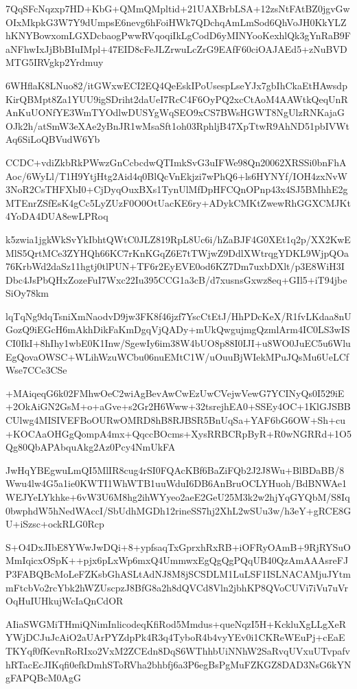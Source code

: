 \documentclass[]{article}
\newenvironment{Shaded}{\begin{snugshade}}{\end{snugshade}}
\newcommand{\NormalTok}[1]{#1}
\begin{document}
\begin{Shaded}
\begin{Highlighting}[]
\NormalTok{7QqSFcNqzxp7HD+KbG+QMmQMpltid+21UAXBrbLSA+12zsNtFAtBZ0jgvGwOIxMkpkG3W7Y9dUmpsE6nevg6hFoiHWk7QDchqAmLmSod6QhVoJH0KkYLZhKNYBowxomLGXDcbaogPwwRVqoqiIkLgCodD6yMINYooKexhlQk3gYnRaB9FaNFhwIxJjBbBIuIMpl+47EID8cFeJLZrwuLcZrG9EAfF60ciOAJAEd5+zNuBVDMTG5IRVgkp2Yrdmuy}

\NormalTok{6WHflaK8LNuo82/itGWxwECI2EQ4QeEskIPoUsespLseYJx7gbIhCkaEtHAwsdpKirQBMpt8Za1YUU9igSDriht2daUeI7RcC4F6OyPQ2xcCtAoM4AAWtkQeqUnRAnKuUONfYE3WmTYOdlwDUSYgWqSEO9xCS7BWsHGWT8NgUlzRNKajaGOJk2h/atSmW3eXAe2yBnJR1wMsaSft1oh03RphljB47XpTtwR9AhND51pbIVWtAq6SiLoQBVudW6Yb}

\NormalTok{CCDC+vdiZkbRkPWwzGnCcbcdwQTImkSvG3uIFWe98Qn20062XRSSi0bnFhAAoc/6WyLl/T1H9YtjHtg2Aid4q0BlQcVnEkjzi7wPhQ6+ls6HYNYf/IOH4zxNvW3NoR2CsTHFXbI0+CjDyqOuxBXs1TynUlMfDpHFCQnOPnp43x4SJ5BMhhE2gMTEnrZSfEsK4gCc5LyZUzF0O0OtUacKE6ry+ADykCMKtZwewRhGGXCMJKt4YoDA4DUA8ewLPRoq}

\NormalTok{k5zwia1jgkWkSvYkIbhtQWtC0JLZ819RpL8Uc6i/hZaBJF4G0XEt1q2p/XX2KwEMlS5QrtMCe3ZYHQh66KC7rKnKGqZ6E7tTWjwZ9DdlXWtrqgYDKL9WjpQOa76KrbWd2daSz11hgtj0tlPUN+TF6r2EyEVE0od6KZ7Dm7uxbDXlt/p3E8WiH3IDbc4JsPbQHxZozeFuI7Wxc22Iu395CCG1a3cB/d7xusnsGxwz8eq+GIl5+iT94jbeSiOy78km}

\NormalTok{lqTqNg9dqTsniXmNaodvD9jw3FK8f46jzf7YscCtEtJ/HhPDcKeX/R1fvLKdaa8nUGozQ9iEGcH6mAkhDikFaKmDgqVjQADy+mUkQwgujmgQzmlArm4IC0LS3wISCI0IkI+8hIhy1wbE0K1Inw/SgewIy6im38W4bUO8p88I0IJI+u8WO0JuEC5u6WluEgQovaOWSC+WLihWzuWCbu06nuEMtC1W/uOuuBjWIekMPuJQsMu6UeLCfWse7CCe3CSe}

\NormalTok{+MAiqeqG6k02FMhwOeC2wiAgBevAwCwEzUwCVejwVewG7YCINyQs0I529iE+2OkAiGN2GsM+o+aGve+s2Gr2H6Www+32tsrejhEA0+SSEy4OC+1KlGJSBBCUlwg4MISIVEFBoOURwOMRD8hB8RJBSR5BnUqSa+YAF6bG6OW+Sh+cu+KOCAaOHGgQompA4mx+QqccBOcms+XysRRBCRpByR+R0wNGRRd+1O5Qg80QbAPAbquAkg2Az0Pcy4NmUkFA}

\NormalTok{JwHqYBEgwuLmQI5MlIR8cug4rSI0FQAcKBf6BaZiFQb2J2J8Wu+BlBDaBB/8Wwu4lw4G5a1ie0KWTI1WhWTB1uuWduI6DB6AnBruOCLYHuoh/BdBNWAe1WEJYeLYkhke+6vW3U6M8hg2ihWYyeo2aeE2GeU25M3k2w2hjYqGYQbM/S8Iq0bwphdW5hNedWAccI/SbUdhMGDh12rineSS7hj2XhL2wSUu3w/h3eY+gRCE8GU+iSzsc+ockRLG0Rcp}

\NormalTok{S+O4DxJIbE8YWwJwDQi+8+ypfsaqTxGprxhRxRB+iOFRyOAmB+9RjRYSuOMmIqicxOSpK++pjx6pLxWp6mxQ4UmmwxEgQgQgPQqUB40QzAmAAAsreFJP3FABQBcMoLeFZKsbGhASLtAdNJ8M8jSCSDLM1LuLSF1ISLNACAMjuJYtmmFtcbVo2rcYbk2hWZUscpzJ8BfG8a2h8dQVCd8Vln2jbhKP8QVoCUVi7iVu7uVrOqHuIUHkujWcIaQnCdOR}

\NormalTok{AIiaSWGMiTHmiQNimInlicodeqKfiRod5Mmdus+queNqzI5H+KckluXgLLgXeRYWjDCJuJcAiO2aUArPYZdpPk4R3q4TyboR4b4vyYEv0i1CKReWEuPj+cEaETKYqf0fKevnRoRIxo2VxM2ZCEdn8DqS6WThhbUiNNhW2SaRvqUVxuUTvpafvhRTacEcJIKqfi0efkDmhSToRVha2bhbfj6a3P6egBsPgMuFZKGZ8DAD3NsG6kYNgFAPQBcM0AgG}


\end{Highlighting}
\end{Shaded}
\end{document}
